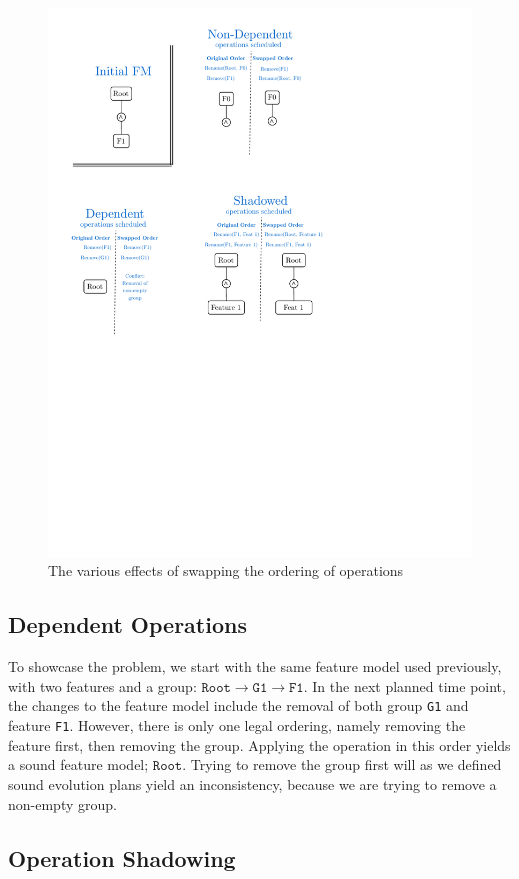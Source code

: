 \documentclass[a4paper,english]{ifimaster}
\begin{document}
\begin{figure}[htpb]
  \centering
  \includegraphics[width=0.8\linewidth]{operation_swap_effect.pdf}
  \caption{The various effects of swapping the ordering of operations}%
  \label{fig:operation_swap_effect}
\end{figure}

\subsection*{Dependent Operations}%
\label{sub:dependent_operations}

To showcase the problem, we start with the same feature model used previously, with two features and a group: $\texttt{Root} \rightarrow \texttt{G1} \rightarrow \texttt{F1}$. In the next planned time point, the changes to the feature model include the removal of both group \texttt{G1} and feature \texttt{F1}. However, there is only one legal ordering, namely removing the feature first, then removing the group. Applying the operation in this order yields a sound feature model; $\texttt{Root}$. Trying to remove the group first will as we defined sound evolution plans yield an inconsistency, because we are trying to remove a non-empty group. 

\subsection*{Operation Shadowing}%
\label{sub:operation_shadowing}
\end{document}
